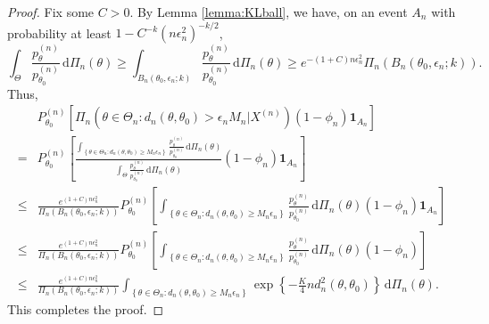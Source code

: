 \documentclass[11pt]{article}
\theoremstyle{plain}
\theoremstyle{definition}
\theoremstyle{remark}
\begin{document}
\begin{proof}
    Fix some $C>0$.
    By Lemma \ref{lemma:KLball}, we have, on an event $A_n$ with probability at least $1-C^{-k} (n\epsilon_n^2)^{-k/2}$,
    \begin{equation*}
        \int_{\Theta}
\frac{p_{\theta}^{(n)}}{p_{\theta_0}^{(n)}}
\, \mathrm d \Pi_n (\theta) 
\geq
\int_{B_n\left( \theta_0, \epsilon_n ; k \right)}
\frac{p_{\theta}^{(n)}}{p_{\theta_0}^{(n)}}
\, \mathrm d \Pi_n (\theta) 
\geq
e^{-(1+C) n \epsilon_n^2} 
\Pi_n \left( B_n \left( \theta_0, \epsilon_n ; k \right) \right).
    \end{equation*}
    Thus,
    \begin{align*}
    &
    P_{\theta_0}^{(n)} \left[ 
        \Pi_n \left(
            \theta \in \Theta_n : d_n (\theta,\theta_0) >   \epsilon_n M_n
        |X^{(n)} \right) (1-\phi_n) \mathbf 1_{A_n} 
    \right]    
    \\
    =&
    P_{\theta_0}^{(n)} \left[ 
        \frac{
        \int_{
            \left\{ \theta \in \Theta_n :  d_n (\theta, \theta_0) \geq M_n \epsilon_n  \right\}
            } \frac{p_{\theta}^{(n)}}{p_{\theta_0}^{(n)}} 
            \, \mathrm d \Pi_n \left( \theta \right)
        }{
        \int_\Theta
             \frac{p_{\theta}^{(n)}}{p_{\theta_0}^{(n)}} 
            \, \mathrm d \Pi_n \left( \theta \right)
        }  
        (1-\phi_n) \mathbf 1_{A_n} 
    \right]    
    \\
    \leq &
        \frac{
e^{(1+C) n \epsilon_n^2} 
        }{
\Pi_n \left( B_n \left( \theta_0, \epsilon_n ; k \right) \right)
        }  
    P_{\theta_0}^{(n)} \left[ 
        \int_{
            \left\{ \theta \in \Theta_n :  d_n (\theta, \theta_0) \geq M_n \epsilon_n  \right\}
            } \frac{p_{\theta}^{(n)}}{p_{\theta_0}^{(n)}} 
            \, \mathrm d \Pi_n \left( \theta \right)
        (1-\phi_n) \mathbf 1_{A_n} 
    \right]    
    \\
    \leq &
        \frac{
e^{(1+C) n \epsilon_n^2} 
        }{
\Pi_n \left( B_n \left( \theta_0, \epsilon_n ; k \right) \right)
        }  
    P_{\theta_0}^{(n)} \left[ 
        \int_{
            \left\{ \theta \in \Theta_n :  d_n (\theta, \theta_0) \geq M_n \epsilon_n  \right\}
            } \frac{p_{\theta}^{(n)}}{p_{\theta_0}^{(n)}} 
            \, \mathrm d \Pi_n \left( \theta \right)
        (1-\phi_n)
    \right]    
    \\
    \leq &
        \frac{
e^{(1+C) n \epsilon_n^2} 
        }{
\Pi_n \left( B_n \left( \theta_0, \epsilon_n ; k \right) \right)
        }  
        \int_{
            \left\{ \theta \in \Theta_n :  d_n (\theta, \theta_0) \geq M_n \epsilon_n  \right\}
        } 
            \exp \left\{-\frac{K}{4}n d_n^2(\theta,\theta_0) \right\}
            \, \mathrm d \Pi_n \left( \theta \right).
    \end{align*}
This completes the proof.

\end{proof}
\end{document}
